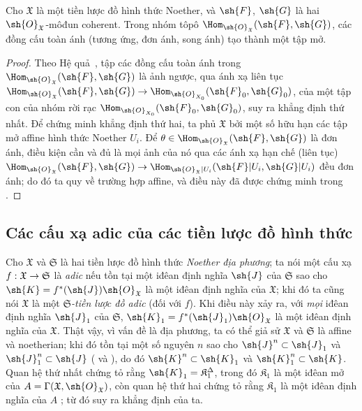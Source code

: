 \documentclass[oneside]{amsart}
\makeatletter
\newcommand{\ega@arrow}[2]{\mathchoice{#1}{#2}{#2}{#2}}
\renewcommand{\to}{\ega@arrow{\longrightarrow}{\rightarrow}}
\newcommand{\oldpage}[2][]{{\marginnote{\normalfont\textbf{#1}~|~#2}}\ignorespaces}
\let\EGAOriginalLabel\label
\renewcommand{\label}[1]{\phantomsection\EGAOriginalLabel{#1}}
\makeatother
\begin{document}
\begin{proposition}[10.11.9]
\label{I.10.11.9}
Cho $\mathfrak{X}$ là một tiền lược đồ hình thức Noether, và $\sh{F}$, $\sh{G}$ là hai $\sh{O}_\mathfrak{X}$-môđun coherent.
Trong nhóm tôpô $\Hom_{\sh{O}_\mathfrak{X}}(\sh{F},\sh{G})$, các đồng cấu toàn ánh (tương ứng, đơn ánh, song ánh) tạo thành một tập mở.
\end{proposition}

\begin{proof}
Theo Hệ quả~, tập các đồng cấu toàn ánh trong $\Hom_{\sh{O}_\mathfrak{X}}(\sh{F},\sh{G})$ là ảnh ngược, qua ánh xạ liên tục $\Hom_{\sh{O}_\mathfrak{X}}(\sh{F},\sh{G})\to\Hom_{\sh{O}_{X_0}}(\sh{F}_0,\sh{G}_0)$, của một tập con của nhóm rời rạc $\Hom_{\sh{O}_{X_0}}(\sh{F}_0,\sh{G}_0)$, suy ra khẳng định thứ nhất.
Để chứng minh khẳng định thứ hai, ta phủ $\mathfrak{X}$ bởi một số hữu hạn các tập mở affine hình thức Noether $U_i$.
Để $\theta\in\Hom_{\sh{O}_\mathfrak{X}}(\sh{F},\sh{G})$ là đơn ánh, điều kiện cần và đủ là mọi ảnh của nó qua các ánh xạ hạn chế (liên tục) $\Hom_{\sh{O}_\mathfrak{X}}(\sh{F},\sh{G})\to\Hom_{\sh{O}_\mathfrak{X}|U_i}(\sh{F}|U_i,\sh{G}|U_i)$ đều đơn ánh; do đó ta quy về trường hợp affine, và điều này đã được chứng minh trong .
\end{proof}

\subsection{Các cấu xạ adic của các tiền lược đồ hình thức}
\label{subsection:I.10.12}

\begin{env}[10.12.1]
\label{I.10.12.1}
\oldpage[I]{206}
Cho $\mathfrak{X}$ và $\mathfrak{S}$ là hai tiền lược đồ hình thức \emph{Noether địa phương};
ta nói một cấu xạ $f:\mathfrak{X}\to\mathfrak{S}$ là \emph{adic} nếu tồn tại một iđêan định nghĩa $\sh{J}$ của $\mathfrak{S}$ sao cho $\sh{K}=f^*(\sh{J})\sh{O}_\mathfrak{X}$ là một iđêan định nghĩa của $\mathfrak{X}$;
khi đó ta cũng nói $\mathfrak{X}$ là một \emph{$\mathfrak{S}$-tiền lược đồ adic} (đối với $f$).
Khi điều này xảy ra, với \emph{mọi} iđêan định nghĩa $\sh{J}_1$ của $\mathfrak{S}$, $\sh{K}_1=f^*(\sh{J}_1)\sh{O}_\mathfrak{X}$ là một iđêan định nghĩa của $\mathfrak{X}$.
Thật vậy, vì vấn đề là địa phương, ta có thể giả sử $\mathfrak{X}$ và $\mathfrak{S}$ là affine và noetherian;
khi đó tồn tại một số nguyên $n$ sao cho $\sh{J}^n\subset\sh{J}_1$ và $\sh{J}_1^n\subset\sh{J}$ ( và ), do đó $\sh{K}^n\subset\sh{K}_1$ và $\sh{K}_1^n\subset\sh{K}$.
Quan hệ thứ nhất chứng tỏ rằng $\sh{K}_1=\mathfrak{K}_1^\Delta$, trong đó $\mathfrak{K}_1$ là một iđêan mở của $A=\Gamma(\mathfrak{X},\sh{O}_\mathfrak{X})$, còn quan hệ thứ hai chứng tỏ rằng $\mathfrak{K}_1$ là một iđêan định nghĩa của $A$ ; từ đó suy ra khẳng định của ta.
\end{env}
\end{document}
